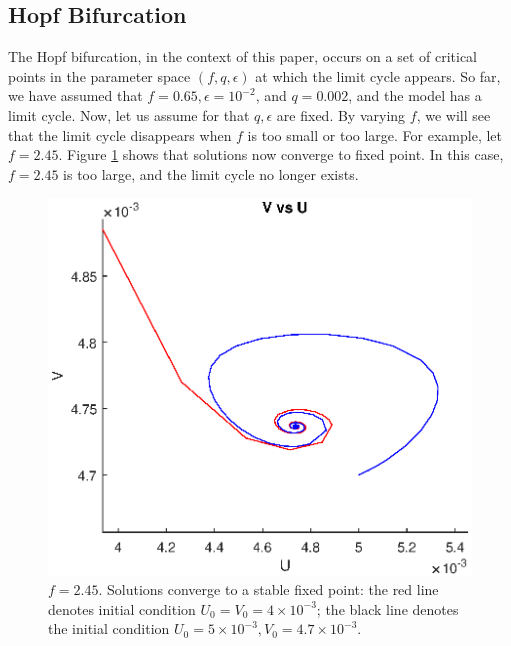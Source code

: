 \documentclass[twocolumn,amsmath,amssymb,aps]{revtex4}
\begin{document}
\subsection{Hopf Bifurcation}

The Hopf bifurcation, in the context of this paper, occurs on a set of critical points in the parameter space $(f,q,\epsilon)$ at which the limit cycle appears. So far, we have assumed that $f = 0.65, \epsilon = 10^{-2}$, and $q = 0.002$, and the model has a limit cycle. Now, let us assume for that $q,\epsilon$ are fixed. By varying $f$, we will see that the limit cycle disappears when $f$ is too small or too large. For example, let $f=2.45$. Figure \ref{fig:hopf1} shows that solutions now converge to fixed point. In this case, $f=2.45$ is too large, and the limit cycle no longer exists.
\begin{figure}[!htb]
	\centering
	\includegraphics[scale=0.6]{hopf1.eps}
	\caption{$f = 2.45$. Solutions converge to a stable fixed point: the red line denotes initial condition $U_0 =V_0 = 4\times 10^{-3}$; the black line denotes the initial condition $U_0 = 5\times 10^{-3}, V_0 = 4.7 \times 10^{-3}$.}
	\label{fig:hopf1}
\end{figure}
\end{document}
